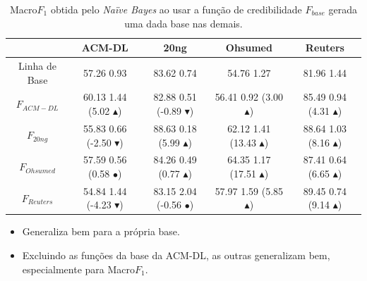 \documentclass[10pt, red]{beamer}
\newcommand{\triangOK}{\textcolor[rgb]{00,0.45,0.10}{$\blacktriangle$}}
\newcommand{\triangBAD}{\textcolor[rgb]{0.7,00,00}{$\blacktriangledown$}}
\newcommand{\ball}{\textcolor[rgb]{0.7,0.70,0.0}{$\bullet$}}
\begin{document}
{\begin{table}[!h]
\centering
\caption{Macro$F_1$ obtida pelo \textit{Naïve Bayes} ao usar a função de credibilidade $F_{base}$ gerada uma dada base nas demais.}
\vspace{-0.5cm}
\label{tab::generalizacao-Macro}
\tiny
\begin{adjustwidth}{-0.7cm}{-0.7cm}%
\begin{tabular}{|c|c|c|c|c|}
\toprule
 & \textbf{ACM-DL} & \textbf{20ng} & \textbf{Ohsumed} & \textbf{Reuters}\tabularnewline
\midrule
\hline
Linha de Base & 57.26 \textpm{} 0.93 & 83.62 \textpm{} 0.74 & 54.76 \textpm{} 1.27 & 81.96 \textpm{} 1.44\tabularnewline
\hline 
$F_{ACM-DL}$ & 60.13 \textpm{} 1.44 (5.02 \triangOK) & 82.88 \textpm{} 0.51 (-0.89 \triangBAD) & 56.41 \textpm{}  0.92 (3.00 \triangOK) & 85.49 \textpm{} 0.94 (4.31 \triangOK)\tabularnewline
\hline 
$F_{20ng}$ & 55.83 \textpm{} 0.66 (-2.50 \triangBAD) & 88.63 \textpm{} 0.18 (5.99 \triangOK) & 62.12 \textpm{} 1.41 (13.43 \triangOK) & 88.64 \textpm{} 1.03 (8.16 \triangOK)\tabularnewline
\hline 
$F_{Ohsumed}$ & 57.59 \textpm{} 0.56 (0.58 \ball) & 84.26 \textpm{}  0.49 (0.77 \triangOK) & 64.35 \textpm{} 1.17 (17.51 \triangOK) & 87.41 \textpm{} 0.64 (6.65 \triangOK)\tabularnewline
\hline 
$F_{Reuters}$ & 54.84 \textpm{} 1.44 (-4.23 \triangBAD) & 83.15 \textpm{} 2.04 (-0.56 \ball) & 57.97 \textpm{} 1.59 (5.85 \triangOK) & 89.45 \textpm{}  0.74 (9.14 \triangOK)\tabularnewline
\bottomrule 
\end{tabular}
\end{adjustwidth}
\end{table}

\begin{itemize}
\item Generaliza bem para a própria base.
\item Excluindo as funções da base da ACM-DL, as outras generalizam bem, especialmente para Macro$F_1$.
\end{itemize}

}
\end{document}
